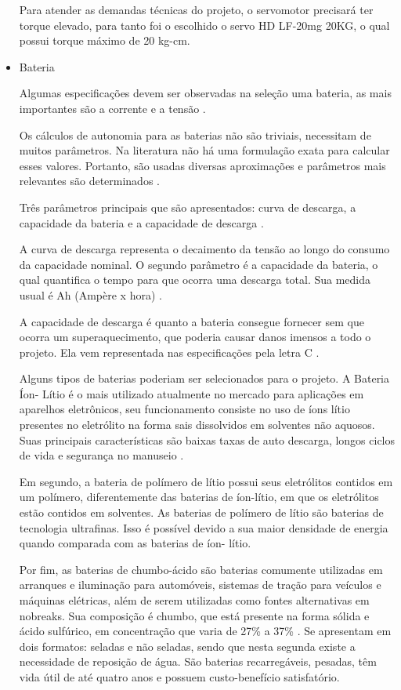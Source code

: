 \begin{itemize}
Para atender as demandas técnicas do projeto, o servomotor precisará ter torque elevado, para tanto foi o escolhido o servo HD LF-20mg 20KG, o qual possui torque máximo de 20 kg-cm.

    \item Bateria

    Algumas especificações devem ser observadas na seleção uma bateria, as mais importantes são a corrente e a
    tensão \cite{MAGALHAES}.

    Os cálculos de autonomia para as baterias não são triviais, necessitam de muitos parâmetros. Na literatura não
    há uma formulação exata para calcular esses valores. Portanto, são usadas diversas aproximações e parâmetros mais
    relevantes são determinados \cite{MEGGLIAR}.

    Três parâmetros principais que são apresentados: curva de descarga, a capacidade da bateria e a capacidade de
    descarga \cite{MEGGLIAR}.

    A curva de descarga representa o decaimento da tensão ao longo do consumo da capacidade nominal. O segundo parâmetro
    é a capacidade da bateria, o qual quantifica o tempo para que ocorra uma descarga total. Sua medida usual é Ah
    (Ampère x hora) \cite{MEGGLIAR}.

    A capacidade de descarga é quanto a bateria consegue fornecer sem que ocorra um superaquecimento, que poderia
    causar danos imensos a todo o projeto. Ela vem representada nas especificações pela letra C \cite{MEGGLIAR}.

    Alguns tipos de baterias poderiam ser selecionados para o projeto. A Bateria Íon- Lítio é o mais utilizado atualmente
    no mercado para aplicações em aparelhos eletrônicos, seu funcionamento consiste no uso de íons lítio presentes no
    eletrólito na forma sais dissolvidos em solventes não aquosos. Suas principais características são baixas taxas de auto
    descarga, longos ciclos de vida e segurança no manuseio \cite{castillo2002advances}.

    Em segundo, a bateria de polímero de lítio possui seus eletrólitos contidos em um polímero, diferentemente das baterias
    de íon-lítio, em que os eletrólitos estão contidos em solventes. As baterias de polímero de lítio são baterias de tecnologia
    ultrafinas. Isso é possível devido a sua maior densidade de energia quando comparada com as baterias de íon- lítio.

    Por fim, as baterias de chumbo-ácido são baterias comumente utilizadas em arranques e iluminação para automóveis,
    sistemas de tração para veículos e máquinas elétricas, além de serem utilizadas como fontes alternativas em nobreaks.
    Sua composição é chumbo, que está presente na forma sólida e ácido sulfúrico, em concentração que varia de 27\% a 37\%
    \cite{pulsada2005juliano}. Se apresentam em dois formatos: seladas e não seladas, sendo que nesta segunda existe a necessidade de
    reposição de água. São baterias recarregáveis, pesadas, têm vida útil de até quatro anos e possuem custo-benefício satisfatório.


\end{itemize}
